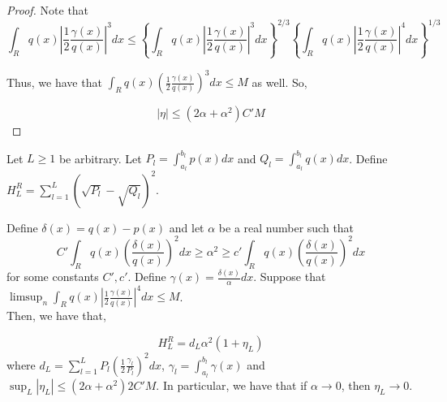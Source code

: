 \begin{proof}
Note that 
\[
\int_R q(x) \left| \frac{1}{2} \frac{\gamma(x)}{q(x)} \right|^3 dx \leq 
    \left\{ \int_R q(x) \left| \frac{1}{2} \frac{\gamma(x)}{q(x)} \right|^3 dx \right\}^{2/3} \left\{\int_R q(x) \left| \frac{1}{2} \frac{\gamma(x)}{q(x)} \right|^4 dx \right\}^{1/3}
\]

Thus, we have that $\int_R q(x) \left( \frac{1}{2} \frac{\gamma(x)}{q(x)} \right)^3 dx \leq M$ as well. So,

\[
|\eta| \leq (2\alpha + \alpha^2) C' M
\]

\end{proof}





\begin{proposition}
\label{prop:discrete_hellinger_chi_square}
Let $L \geq 1$ be arbitrary. Let $P_l = \int_{a_l}^{b_l} p(x) dx$ and $Q_l =  \int_{a_l}^{b_l} q(x) dx$. Define $H^R_L = \sum_{l=1}^L \left( \sqrt{P_l} - \sqrt{Q_l} \right)^2$. 

Define $\delta(x) = q(x) - p(x)$ and let $\alpha$ be a real number such that 
\[
C' \int_R q(x) \left( \frac{\delta(x)}{q(x)} \right)^2 dx \geq \alpha^2 \geq c' \int_R q(x) \left( \frac{\delta(x)}{q(x)} \right)^2 dx
\]
 for some constants $C', c'$. Define $\gamma(x) = \frac{\delta(x)}{\alpha} dx$. Suppose that $\limsup_n \int_R q(x) \left| \frac{1}{2} \frac{\gamma(x)}{q(x)} \right|^4 dx \leq M$.\\
Then, we have that, 

\[
H^R_L = d_L \alpha^2 ( 1 + \eta_L )
\]
where $d_L = \sum_{l=1}^L P_l \left( \frac{1}{2} \frac{\gamma_l}{P_l} \right)^2 dx$, $\gamma_l = \int_{a_l}^{b_l} \gamma(x)$ and $\sup_L |\eta_L | \leq (2 \alpha + \alpha^2) 2 C' M$. In particular, we have that if $\alpha \rightarrow 0$, then $\eta_L \rightarrow 0$. 
\end{proposition}


